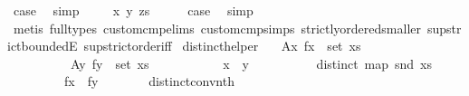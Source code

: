 \begin{isabellebody}
\ {\isacharquery}{\kern0pt}case\ \isamarkupfalse%
\ simp\isanewline
{}\isamarkupfalse%
\isanewline
\ \ \isamarkupfalse%
\ {\isacharparenleft}{\kern0pt}{}\ x\ y\ zs{\isacharparenright}{\kern0pt}\isanewline
\ \ \isamarkupfalse%
\ \isamarkupfalse%
\ {\isacharquery}{\kern0pt}case\ \isamarkupfalse%
\ simp\isanewline
\ \ \ \ \isamarkupfalse%
\ {\isacharparenleft}{\kern0pt}metis\ {\isacharparenleft}{\kern0pt}full{\isacharunderscore}{\kern0pt}types{\isacharparenright}{\kern0pt}\ custom{\isacharunderscore}{\kern0pt}cmp{\isachardot}{\kern0pt}elims{\isacharparenleft}{\kern0pt}{}{\isacharparenright}{\kern0pt}\ custom{\isacharunderscore}{\kern0pt}cmp{\isachardot}{\kern0pt}simps{\isacharparenleft}{\kern0pt}{}{\isacharparenright}{\kern0pt}\ strictly{\isacharunderscore}{\kern0pt}ordered{\isacharunderscore}{\kern0pt}smaller\ sup{\isachardot}{\kern0pt}strict{\isacharunderscore}{\kern0pt}boundedE\ sup{\isachardot}{\kern0pt}strict{\isacharunderscore}{\kern0pt}order{\isacharunderscore}{\kern0pt}iff{\isacharparenright}{\kern0pt}\isanewline
{}\isamarkupfalse%
%
\endisatagproof
{\isafoldproof}%
%
\isadelimproof
\isanewline
%
\endisadelimproof
\isanewline
{}\isamarkupfalse%
\ distinct{\isacharunderscore}{\kern0pt}helper{\isacharcolon}{\kern0pt}\isanewline
\ \ \ A{}{\isacharcolon}{\kern0pt}{\isachardoublequoteopen}{\isacharparenleft}{\kern0pt}x{\isacharcomma}{\kern0pt}\ fx{\isacharparenright}{\kern0pt}\ {\isasymin}\ set\ xs{\isachardoublequoteclose}\ \ \isanewline
\ \ \ \ \ \ \ \ \ \ A{}{\isacharcolon}{\kern0pt}{\isachardoublequoteopen}{\isacharparenleft}{\kern0pt}y{\isacharcomma}{\kern0pt}\ fy{\isacharparenright}{\kern0pt}\ {\isasymin}\ set\ xs{\isachardoublequoteclose}\ \isanewline
\ \ \ \ \ \ \ \ \ \ {\isachardoublequoteopen}x\ {\isasymnoteq}\ y{\isachardoublequoteclose}\isanewline
\ \ \ \ \ \ \ \ \ \ {\isachardoublequoteopen}distinct\ {\isacharparenleft}{\kern0pt}map\ snd\ xs{\isacharparenright}{\kern0pt}{\isachardoublequoteclose}\isanewline
\ \ \ \ \ \ \ \ \ {\isachardoublequoteopen}fx\ {\isasymnoteq}\ fy{\isachardoublequoteclose}\ \ \isanewline
%
\isadelimproof
%
\endisadelimproof
%
\isatagproof
{}\isamarkupfalse%
\ {\isacharminus}{\kern0pt}\isanewline
\ \ \isamarkupfalse%
\ distinct{\isacharunderscore}{\kern0pt}conv{\isacharunderscore}{\kern0pt}nth\isanewline

\end{isabellebody}
